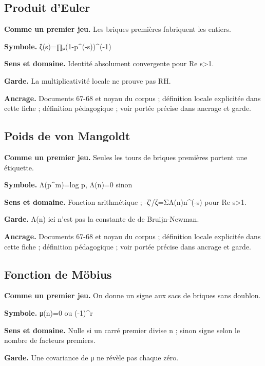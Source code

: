 \documentclass[
  9pt,
  a4paper,
]{article}
\begin{document}
\hypertarget{produit-deuler}{%
\subsection{Produit d'Euler}\label{produit-deuler}}

\textbf{Comme un premier jeu.} Les briques premières fabriquent les
entiers.

\textbf{Symbole.} ζ(s)=∏ₚ(1-p\^{}(-s))\^{}(-1)

\textbf{Sens et domaine.} Identité absolument convergente pour Re
s\textgreater1.

\textbf{Garde.} La multiplicativité locale ne prouve pas RH.

\textbf{Ancrage.} Documents 67-68 et noyau du corpus ; définition locale
explicitée dans cette fiche ; définition pédagogique ; voir portée
précise dans ancrage et garde.

\hypertarget{poids-de-von-mangoldt}{%
\subsection{Poids de von Mangoldt}\label{poids-de-von-mangoldt}}

\textbf{Comme un premier jeu.} Seules les tours de briques premières
portent une étiquette.

\textbf{Symbole.} Λ(p\^{}m)=log p, Λ(n)=0 sinon

\textbf{Sens et domaine.} Fonction arithmétique ; -ζ′/ζ=ΣΛ(n)n\^{}(-s)
pour Re s\textgreater1.

\textbf{Garde.} Λ(n) ici n'est pas la constante de de Bruijn-Newman.

\textbf{Ancrage.} Documents 67-68 et noyau du corpus ; définition locale
explicitée dans cette fiche ; définition pédagogique ; voir portée
précise dans ancrage et garde.

\hypertarget{fonction-de-muxf6bius}{%
\subsection{Fonction de Möbius}\label{fonction-de-muxf6bius}}

\textbf{Comme un premier jeu.} On donne un signe aux sacs de briques
sans doublon.

\textbf{Symbole.} μ(n)=0 ou (-1)\^{}r

\textbf{Sens et domaine.} Nulle si un carré premier divise n ; sinon
signe selon le nombre de facteurs premiers.

\textbf{Garde.} Une covariance de μ ne révèle pas chaque zéro.
\end{document}
